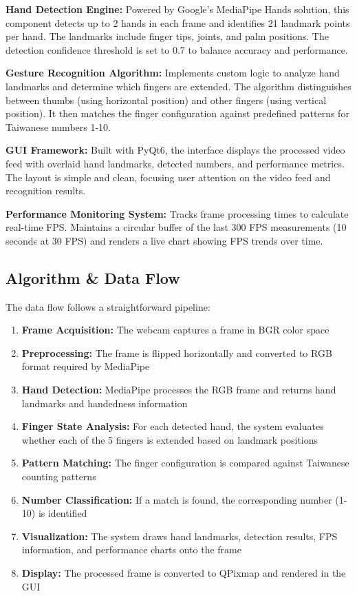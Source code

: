 \documentclass{article}
\begin{document}
\textbf{Hand Detection Engine:} Powered by Google's MediaPipe Hands solution, this component detects up to 2 hands in each frame and identifies 21 landmark points per hand. The landmarks include finger tips, joints, and palm positions. The detection confidence threshold is set to 0.7 to balance accuracy and performance.

\textbf{Gesture Recognition Algorithm:} Implements custom logic to analyze hand landmarks and determine which fingers are extended. The algorithm distinguishes between thumbs (using horizontal position) and other fingers (using vertical position). It then matches the finger configuration against predefined patterns for Taiwanese numbers 1-10.

\textbf{GUI Framework:} Built with PyQt6, the interface displays the processed video feed with overlaid hand landmarks, detected numbers, and performance metrics. The layout is simple and clean, focusing user attention on the video feed and recognition results.

\textbf{Performance Monitoring System:} Tracks frame processing times to calculate real-time FPS. Maintains a circular buffer of the last 300 FPS measurements (10 seconds at 30 FPS) and renders a live chart showing FPS trends over time.

\subsection{Algorithm \& Data Flow}

The data flow follows a straightforward pipeline:

\begin{enumerate}
	\item \textbf{Frame Acquisition:} The webcam captures a frame in BGR color space
	\item \textbf{Preprocessing:} The frame is flipped horizontally and converted to RGB format required by MediaPipe
	\item \textbf{Hand Detection:} MediaPipe processes the RGB frame and returns hand landmarks and handedness information
	\item \textbf{Finger State Analysis:} For each detected hand, the system evaluates whether each of the 5 fingers is extended based on landmark positions
	\item \textbf{Pattern Matching:} The finger configuration is compared against Taiwanese counting patterns
	\item \textbf{Number Classification:} If a match is found, the corresponding number (1-10) is identified
	\item \textbf{Visualization:} The system draws hand landmarks, detection results, FPS information, and performance charts onto the frame
	\item \textbf{Display:} The processed frame is converted to QPixmap and rendered in the GUI
\end{enumerate}
\end{document}
